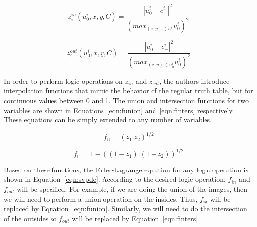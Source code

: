 \documentclass[10pt,twocolumn,letterpaper]{article}
\begin{document}
\begin{equation}
\label{eqn:zin}
z_{i}^{in}(u_{0}^{i},x,y,C) = \frac{|u_{0}^{i} - c_{+}^i|^2}{(max_{(x,y) \in u_{0}^{i}} u_{0}^i)^2}
\end{equation}

\begin{equation}
\label{eqn:zout}
z_{i}^{out}(u_{0}^{i},x,y,C) = \frac{|u_{0}^{i} - c_{-}^i|^2}{(max_{(x,y) \in u_{0}^{i}} u_{0}^i)^2}
\end{equation}

In order to perform logic operations on $z_{in}$ and $z_{out}$, the authors introduce interpolation functions that mimic the behavior of the regular truth
table, but for continuous values between 0 and 1. The union and intersection functions for two variables are shown in Equations~\ref{eqn:funion}
and~\ref{eqn:finters} respectively. These equations can be simply extended to any number of variables.

\begin{equation}
\label{eqn:funion}
f_{\cup} = (z_{1} . z_{2})^{1/2}
\end{equation}

\begin{equation}
\label{eqn:finters}
f_{\cap} = 1 - ((1 - z_{1}) .(1-  z_{2}))^{1/2}
\end{equation}

Based on these functions, the Euler-Lagrange equation for any logic operation is shown in Equation~\ref{eqn:svpde}. According to the desired logic operation,
$f_{in}$ and $f_{out}$ will be specified. For example, if we are doing the union of the images, then we will need to perform a union operation on
the insides. Thus, $f_{in}$ will be replaced by Equation~\ref{eqn:funion}. Similarly, we will need to do the intersection of the outsides so $f_{out}$ will be
replaced by Equation~\ref{eqn:finters}.
\end{document}
